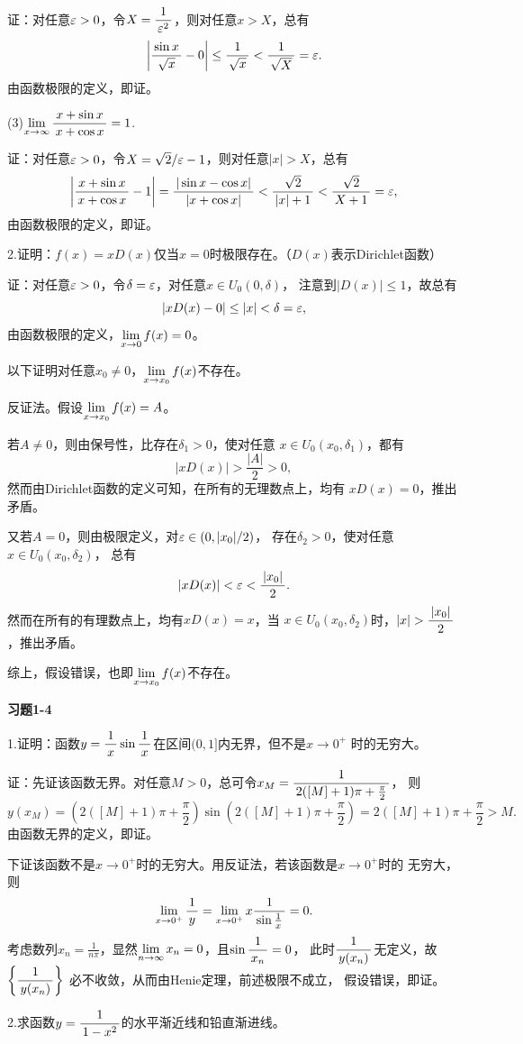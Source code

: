 证：对任意$\varepsilon>0$，令$X=\displaystyle\frac{\,{1}\,}{\,{\varepsilon^2}\,}$，则对任意$x>X$，总有
$$\left|\displaystyle\frac{\,{\sin x}\,}{\,{\sqrt x}\,}-0\right|\leq\displaystyle\frac{\,{1}\,}{\,{\sqrt x}\,}
<\displaystyle\frac{\,{1}\,}{\,{\sqrt X}\,}=\varepsilon.$$
由函数极限的定义，即证。\fin

\bs
(3)$\lim\limits_{x\to{\infty}}\displaystyle\frac{\,{x+\sin x}\,}{\,{x+\cos x}\,}=1$.

证：对任意$\varepsilon>0$，令$X=\sqrt2/\varepsilon-1$，则对任意$|x|>X$，总有
$$\left|\displaystyle\frac{\,{x+\sin x}\,}{\,{x+\cos x}\,}-1\right|
=\displaystyle\frac{\,{|\sin x-\cos x|}\,}{\,{|x+\cos x|}\,}
<\displaystyle\frac{\,{\sqrt2}\,}{\,{|x|+1}\,}<\displaystyle\frac{\,{\sqrt2}\,}{\,{X+1}\,}=\varepsilon,$$
由函数极限的定义，即证。\fin

\bs
2.证明：$f(x)=xD(x)$仅当$x=0$时极限存在。（$D(x)$表示Dirichlet函数）

证：对任意$\varepsilon>0$，令$\delta=\varepsilon$，对任意$x\in U_0(0,\delta)$，
注意到$|D(x)|\leq 1$，故总有
$$|xD(x)-0|\leq |x|<\delta=\varepsilon,$$
由函数极限的定义，$\lim\limits_{x\to{0}}f(x)=0$。

以下证明对任意$x_0\ne 0$，$\lim\limits_{x\to{x_0}}f(x)$不存在。

反证法。假设$\lim\limits_{x\to{x_0}}f(x)=A$。

若$A\ne 0$，则由保号性，比存在$\delta_1>0$，使对任意
$x\in U_0(x_0,\delta_1)$，都有
$$|xD(x)|>\frac {|A|}2>0,$$
然而由Dirichlet函数的定义可知，在所有的无理数点上，均有
$xD(x)=0$，推出矛盾。

又若$A=0$，则由极限定义，对$\varepsilon\in(0,|x_0|/2)$，
存在$\delta_2>0$，使对任意$x\in U_0(x_0,\delta_2)$，
总有
$$|xD(x)|<\varepsilon<\displaystyle\frac{\,{|x_0|}\,}{\,{2}\,}.$$
然而在所有的有理数点上，均有$xD(x)=x$，当
$x\in U_0(x_0,\delta_2)$时，$|x|>\df{|x_0|}2$，推出矛盾。

综上，假设错误，也即$\lim\limits_{x\to{x_0}}f(x)$不存在。\fin

\bigskip

\begin{center}
	\bf 习题1-4
\end{center}

1.证明：函数$y=\displaystyle\frac{\,{1}\,}{\,{x}\,}\sin\displaystyle\frac{\,{1}\,}{\,{x}\,}$在区间$(0,1]$内无界，但不是$x\to0^+$
时的无穷大。

证：先证该函数无界。对任意$M>0$，总可令$x_M=\displaystyle\frac{\,{1}\,}{\,{2([M]+1)\pi+\frac{\pi}2}\,}$，
则
$$y(x_M)=\left(2([M]+1)\pi+\frac{\pi}2\right)\sin(2([M]+1)\pi+\frac{\pi}2)
=2([M]+1)\pi+\frac{\pi}2>M.$$
由函数无界的定义，即证。

下证该函数不是$x\to0^+$时的无穷大。用反证法，若该函数是$x\to0^+$时的
无穷大，则
$$\lim\limits_{x\to{0^+}}\displaystyle\frac{\,{1}\,}{\,{y}\,}=\lim\limits_{x\to{0^+}}x\displaystyle\frac{\,{1}\,}{\,{\sin\frac1x}\,}=0.$$
考虑数列$x_n=\frac1{n\pi}$，显然$\lim\limits_{n\to\infty} x_n=0$，且$\sin\displaystyle\frac{\,{1}\,}{\,{x_n}\,}=0$，
此时$\displaystyle\frac{\,{1}\,}{\,{y(x_n)}\,}$无定义，故$\left\{\displaystyle\frac{\,{1}\,}{\,{y(x_n)}\,}\right\}$
必不收敛，从而由Henie定理，前述极限不成立，
假设错误，即证。\fin

\bigskip
2.求函数$y=\displaystyle\frac{\,{1}\,}{\,{1-x^2}\,}$的水平渐近线和铅直渐进线。

